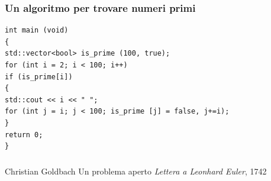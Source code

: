 \documentclass[xcolor=dvipsnames,aspectratio=169]{beamer}
\makeatletter
\newcommand{\email}[1]{\href{mailto:msecchi@eurac.edu}{\emph{msecchi@eurac.edu}}}
\newcommand{\authorname}[1]{Mattia Secchi - PhD Student}
\newcommand{\institutename}[1]{Institute for Renewable Energy}
\makeatother
\begin{document}
{\begin{frame}
\begin{columns}
\end{columns}
\end{frame}


\begin{frame}[fragile]
\frametitle{Un algoritmo per trovare numeri primi}
\begin{verbatim}
int main (void)
{
std::vector<bool> is_prime (100, true);
for (int i = 2; i < 100; i++)
if (is_prime[i])
{
std::cout << i << " ";
for (int j = i; j < 100; is_prime [j] = false, j+=i);
}
return 0;
}
\end{verbatim}
\end{frame}


\begin{frame}
\frametitle{\refname}
\begin{thebibliography}{9}
 Christian Goldbach
\newblock Un problema aperto
\newblock \emph{Lettera a Leonhard Euler}, 1742
\end{thebibliography}
\end{frame}

} %


{

}
\end{document}
